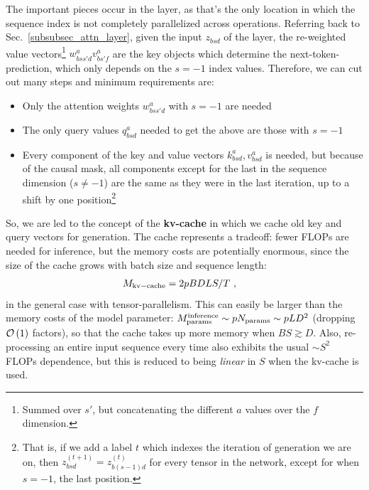 \documentclass[11pt]{article}
\begin{document}
The important pieces occur in the  layer, as that's the only location in
which the sequence index is not completely parallelized across operations. Referring back to
Sec.~\ref{subsubsec_attn_layer}, given the input $ z _{ bsd } $ of the 
layer, the re-weighted value vectors\footnote{Summed over $ s' $, but concatenating the different $
a $ values over the $ f $ dimension.} $ w ^{ a }_{ bss'd } v ^{ a } _{ bs'f } $ are the key objects
which determine the next-token-prediction, which only depends on the $ s=-1 $ index values.
Therefore, we can cut out many steps and minimum requirements are:
\begin{itemize}
    \item Only the attention weights $ w ^{ a }_{ bss'd }$ with $ s=-1 $ are needed
    \item The only query values $ q ^{ a }_{ bsd } $ needed to get the above are those with $ s=-1 $
    \item Every component of the key and value vectors $k ^{ a }_{ bsd }, v ^{ a }_{ bsd } $ is
        needed, but because of the causal mask, all components except for the last in the sequence
        dimension ($ s\neq -1 $) are the same as they were in the last iteration, up to a shift
        by one position\footnote{That is, if we add a label $ t $ which indexes the iteration of generation
        we are on, then $ z ^{ (t+1) } _{ bsd } = z ^{ (t)} _{ b (s-1)d } $ for every tensor in the network, except for when $ s=-1 $, the last position.}
\end{itemize}

So, we are led to the concept of the \textbf{kv-cache} in which we cache old key and query vectors for generation.
The cache represents a tradeoff: fewer FLOPs are needed for inference, but the memory costs are potentially
enormous, since the size of the cache grows with batch size and sequence length:
\begin{align}
    M _{ {\rm kv-cache}  } &= 2pBDLS /T\ ,  \label{eq_kv_cache_memory}
\end{align}
in the general case with tensor-parallelism. This can easily be larger than the memory costs of the
model parameter: $ M _{ {\rm params}  } ^{ {\rm  inference}  } \sim p N _{ {\rm params}  } \sim p LD
^{ 2 }  $ (dropping $ \mathcal{O} \left( 1 \right)  $ factors), so that the cache takes up more memory
when $ BS \gtrsim D $. Also, re-processing an entire input sequence every time also exhibits the
usual $\sim S ^{ 2 }  $ FLOPs dependence, but this is reduced to being \textit{linear} in $ S $
when the kv-cache is used.
\end{document}
